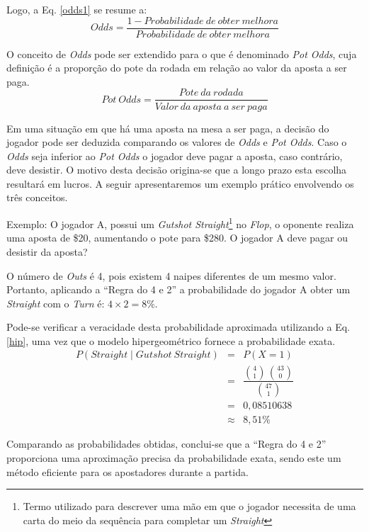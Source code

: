 \documentclass[
	12pt,				%
	oneside,			%
	a4paper,			%
	chapter=TITLE,		%
	section=TITLE,		%
	subsection=Title,	%
	subsubsection=Title,%
	brazil,				%
	]{abntex2}
\begin{document}
Logo, a Eq. \ref{odds1} se resume a:
\begin{equation} \label{odds2}
Odds = \frac{1 - Probabilidade\ de\ obter\ melhora}{Probabilidade\ de\ obter\ melhora}
\end{equation}

O conceito de \textit{Odds} pode ser extendido para o que é denominado \textit{Pot Odds}, cuja definição é a proporção do pote da rodada em relação ao valor da aposta a ser paga.
\begin{equation} \label{potodds}
Pot\ Odds = \frac{Pote\ da\ rodada}{Valor\ da\ aposta\ a\ ser\ paga}
\end{equation}

Em uma situação em que há uma aposta na mesa a ser paga, a decisão do jogador pode ser deduzida comparando os valores de \textit{Odds} e \textit{Pot Odds}. Caso o \textit{Odds} seja inferior ao \textit{Pot Odds} o jogador deve pagar a aposta, caso contrário, deve desistir. O motivo desta decisão origina-se que a longo prazo esta escolha resultará em lucros.
A seguir apresentaremos um exemplo prático envolvendo os três conceitos.

Exemplo: O jogador A, possui um \textit{Gutshot Straight}\footnote{Termo utilizado para descrever uma mão em que o jogador necessita de uma carta do meio da sequência para completar um \textit{Straight}} no \textit{Flop}, o oponente realiza uma aposta de \$20, aumentando o pote para \$280. O jogador A deve pagar ou desistir da aposta?

O número de \textit{Outs} é 4, pois existem 4 naipes diferentes de um mesmo valor. Portanto, aplicando a ``Regra do 4 e 2'' a probabilidade do jogador A obter um \textit{Straight} com o \textit{Turn} é: $4\times2=8\%$.

Pode-se verificar a veracidade desta probabilidade aproximada utilizando a Eq. \ref{hip}, uma vez que o modelo hipergeométrico fornece a probabilidade exata.
\begin{eqnarray*}
	P(Straight \mid Gutshot\ Straight) & = & P(X = 1)\\
	& = & \dfrac{\binom{4}{1}\,\binom{43}{0}}{\binom{47}{1}} \\
	& = & 0,08510638\\
	& \approx & 8,51\%
\end{eqnarray*}

Comparando as probabilidades obtidas, conclui-se que a ``Regra do 4 e 2'' proporciona uma aproximação precisa da probabilidade exata, sendo este um método eficiente para os apostadores durante a partida.
\end{document}
